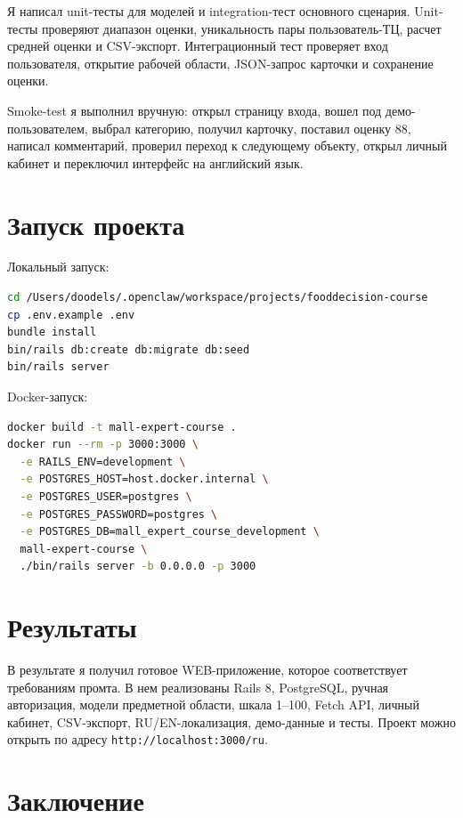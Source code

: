 \documentclass[14pt,a4paper]{extarticle}
\begin{document}
Я написал unit-тесты для моделей и integration-тест основного сценария. Unit-тесты проверяют диапазон оценки, уникальность пары пользователь-ТЦ, расчет средней оценки и CSV-экспорт. Интеграционный тест проверяет вход пользователя, открытие рабочей области, JSON-запрос карточки и сохранение оценки.

Smoke-test я выполнил вручную: открыл страницу входа, вошел под демо-пользователем, выбрал категорию, получил карточку, поставил оценку 88, написал комментарий, проверил переход к следующему объекту, открыл личный кабинет и переключил интерфейс на английский язык.

\section{Запуск проекта}

Локальный запуск:

\begin{lstlisting}[language=bash,caption={Команды локального запуска}]
cd /Users/doodels/.openclaw/workspace/projects/fooddecision-course
cp .env.example .env
bundle install
bin/rails db:create db:migrate db:seed
bin/rails server
\end{lstlisting}

Docker-запуск:

\begin{lstlisting}[language=bash,caption={Команды Docker-запуска}]
docker build -t mall-expert-course .
docker run --rm -p 3000:3000 \
  -e RAILS_ENV=development \
  -e POSTGRES_HOST=host.docker.internal \
  -e POSTGRES_USER=postgres \
  -e POSTGRES_PASSWORD=postgres \
  -e POSTGRES_DB=mall_expert_course_development \
  mall-expert-course \
  ./bin/rails server -b 0.0.0.0 -p 3000
\end{lstlisting}

\section{Результаты}

В результате я получил готовое WEB-приложение, которое соответствует требованиям промта. В нем реализованы Rails 8, PostgreSQL, ручная авторизация, модели предметной области, шкала 1--100, Fetch API, личный кабинет, CSV-экспорт, RU/EN-локализация, демо-данные и тесты. Проект можно открыть по адресу \texttt{http://localhost:3000/ru}.

\section{Заключение}
\end{document}
